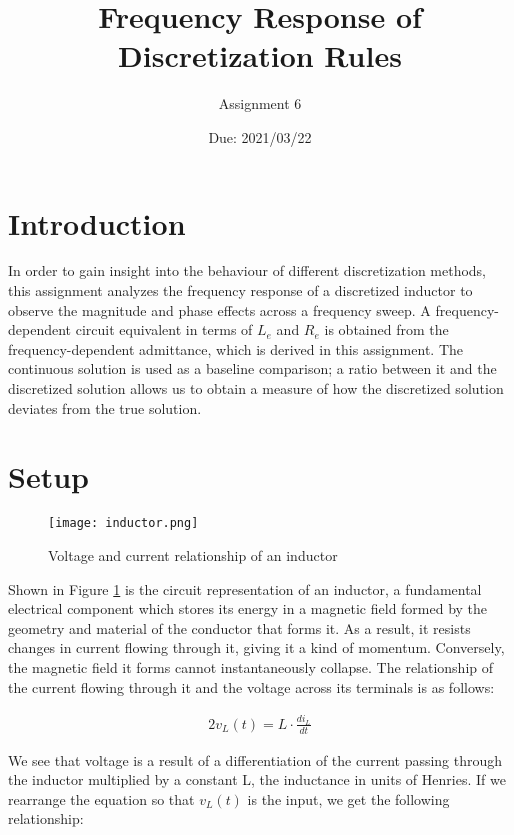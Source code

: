 \documentclass[10pt, oneside, letterpaper]{article}
\title{Frequency Response of Discretization Rules}
\author{Assignment 6}
\date{Due: 2021/03/22}
\begin{document}
\maketitle
\thispagestyle{fancy}

\section{Introduction}

In order to gain insight into the behaviour of different discretization methods, this assignment analyzes the frequency response of a discretized inductor to observe the magnitude and phase effects across a frequency sweep. A frequency-dependent circuit equivalent in terms of $L_e$ and $R_e$ is obtained from the frequency-dependent admittance, which is derived in this assignment. The continuous solution is used as a baseline comparison; a ratio between it and the discretized solution allows us to obtain a measure of how the discretized solution deviates from the true solution.

\section{Setup}

\begin{figure}[H]
  \centering
  \texttt{[image: inductor.png]}
  \caption{Voltage and current relationship of an inductor}
  \label{inductor}
\end{figure}

Shown in Figure \ref{inductor} is the circuit representation of an inductor, a fundamental electrical component which stores its energy in a magnetic field formed by the geometry and material of the conductor that forms it. As a result, it resists changes in current flowing through it, giving it a kind of momentum. Conversely, the magnetic field it forms cannot instantaneously collapse. The relationship of the current flowing through it and the voltage across its terminals is as follows:

\begin{alignat}{2}
  v_L(t) = L\cdot{}\frac{di_L}{dt} 
\end{alignat}

We see that voltage is a result of a differentiation of the current passing through the inductor multiplied by a constant L, the inductance in units of Henries. If we rearrange the equation so that $v_L(t)$ is the input, we get the following relationship:
\end{document}
